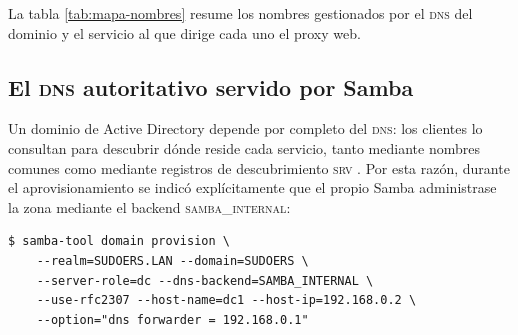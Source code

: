 La tabla \ref{tab:mapa-nombres} resume los nombres gestionados por el
\textsc{dns} del dominio y el servicio al que dirige cada uno el proxy web.

\begin{table}[H]
\centering
\caption{Mapa de nombres del dominio y su backend en el proxy}
\label{tab:mapa-nombres}
\end{table}

\subsection{El \textsc{dns} autoritativo servido por Samba}

Un dominio de Active Directory depende por completo del \textsc{dns}: los
clientes lo consultan para descubrir d\'onde reside cada servicio, tanto
mediante nombres comunes como mediante registros de descubrimiento
\textsc{srv} \cite{rfc2782, msft_activedirectory}. Por esta raz\'on, durante
el aprovisionamiento se indic\'o expl\'icitamente que el propio Samba
administrase la zona mediante el backend \textsc{samba\_internal}:

\begin{lstlisting}[style=terminal]
$ samba-tool domain provision \
    --realm=SUDOERS.LAN --domain=SUDOERS \
    --server-role=dc --dns-backend=SAMBA_INTERNAL \
    --use-rfc2307 --host-name=dc1 --host-ip=192.168.0.2 \
    --option="dns forwarder = 192.168.0.1"
\end{lstlisting}

